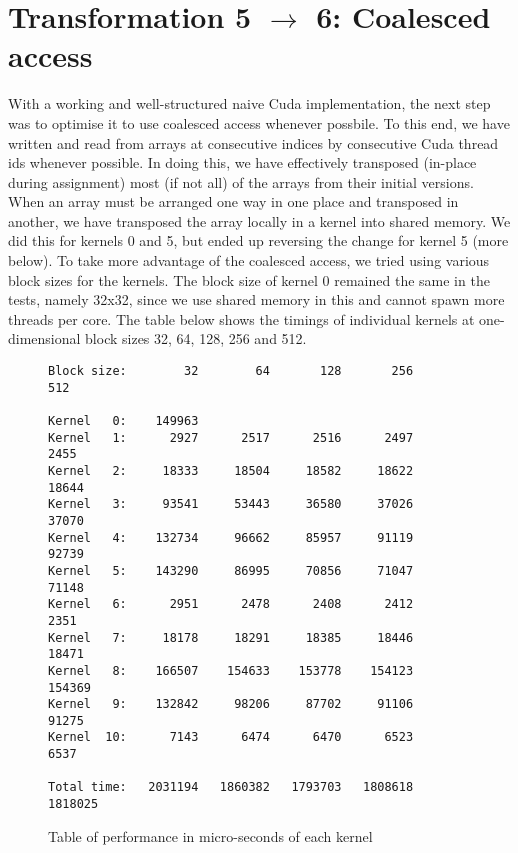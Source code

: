 \section{Transformation 5 $\rightarrow$ 6: Coalesced access}

With a working and well-structured naive Cuda implementation, the next step was to optimise it to use coalesced access whenever possbile. To this end, we have written and read from arrays at consecutive indices by consecutive Cuda thread ids whenever possible. In doing this, we have effectively transposed (in-place during assignment) most (if not all) of the arrays from their initial versions.\n
When an array must be arranged one way in one place and transposed in another, we have transposed the array locally in a kernel into shared memory. We did this for kernels 0 and 5, but ended up reversing the change for kernel 5 (more below).\n
To take more advantage of the coalesced access, we tried using various block sizes for the kernels. The block size of kernel 0 remained the same in the tests, namely 32x32, since we use shared memory in this and cannot spawn more threads per core. The table below shows the timings of individual kernels at one-dimensional block sizes 32, 64, 128, 256 and 512.


\begin{figure}[H]
    \centering
\begin{Verbatim}[label={Running time for individual kernels}]
Block size:        32        64       128       256       512

Kernel   0:    149963
Kernel   1:      2927      2517      2516      2497      2455
Kernel   2:     18333     18504     18582     18622     18644
Kernel   3:     93541     53443     36580     37026     37070
Kernel   4:    132734     96662     85957     91119     92739
Kernel   5:    143290     86995     70856     71047     71148
Kernel   6:      2951      2478      2408      2412      2351
Kernel   7:     18178     18291     18385     18446     18471
Kernel   8:    166507    154633    153778    154123    154369
Kernel   9:    132842     98206     87702     91106     91275
Kernel  10:      7143      6474      6470      6523      6537

Total time:   2031194   1860382   1793703   1808618   1818025

\end{Verbatim}
\caption{Table of performance in micro-seconds of each kernel}
\end{figure}

